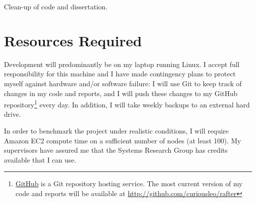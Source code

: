 \documentclass[12pt]{scrartcl}
\begin{document}
Clean-up of code and dissertation.


\section{Resources Required%
  \label{resources-required}%
}
%
Development will predominantly be on my laptop running Linux. I accept full responsibility for this machine and I have made contingency plans to protect myself against hardware and/or software failure: I will use Git to keep track of changes in my code and reports, and I will push these changes to my GitHub repository\footnote{\href{http://github.com}{GitHub} is a Git repository hosting service. The most current version of my code and reports will be available at \url{http://github.com/curiousleo/rafter}}  every day. In addition, I will take weekly backups to an external hard drive.

In order to benchmark the project under realistic conditions, I will require Amazon EC2 compute time on a sufficient number of nodes (at least 100). My supervisors have assured me that the Systems Research Group has credits available that I can use.



\end{document}
